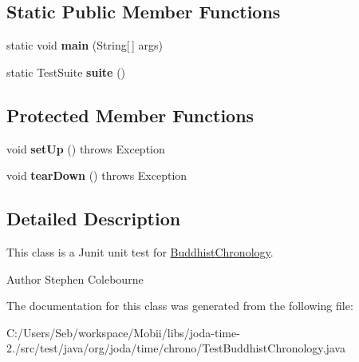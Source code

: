 \subsection*{Static Public Member Functions}
\begin{DoxyCompactItemize}
\item 
\hypertarget{classorg_1_1joda_1_1time_1_1chrono_1_1_test_buddhist_chronology_a3ef1d36da8af4e11a706c5406838f639}{static void {\bfseries main} (String\mbox{[}$\,$\mbox{]} args)}\label{classorg_1_1joda_1_1time_1_1chrono_1_1_test_buddhist_chronology_a3ef1d36da8af4e11a706c5406838f639}

\item 
\hypertarget{classorg_1_1joda_1_1time_1_1chrono_1_1_test_buddhist_chronology_ae6ef31639ce31a99a58aafcbc7c4f91e}{static Test\-Suite {\bfseries suite} ()}\label{classorg_1_1joda_1_1time_1_1chrono_1_1_test_buddhist_chronology_ae6ef31639ce31a99a58aafcbc7c4f91e}

\end{DoxyCompactItemize}
\subsection*{Protected Member Functions}
\begin{DoxyCompactItemize}
\item 
\hypertarget{classorg_1_1joda_1_1time_1_1chrono_1_1_test_buddhist_chronology_aac943cf994384e84078bd332566305e5}{void {\bfseries set\-Up} ()  throws Exception }\label{classorg_1_1joda_1_1time_1_1chrono_1_1_test_buddhist_chronology_aac943cf994384e84078bd332566305e5}

\item 
\hypertarget{classorg_1_1joda_1_1time_1_1chrono_1_1_test_buddhist_chronology_a094091369cb1e7ff5d5949b1d19d3d20}{void {\bfseries tear\-Down} ()  throws Exception }\label{classorg_1_1joda_1_1time_1_1chrono_1_1_test_buddhist_chronology_a094091369cb1e7ff5d5949b1d19d3d20}

\end{DoxyCompactItemize}


\subsection{Detailed Description}
This class is a Junit unit test for \hyperlink{classorg_1_1joda_1_1time_1_1chrono_1_1_buddhist_chronology}{Buddhist\-Chronology}.

\begin{DoxyAuthor}{Author}
Stephen Colebourne 
\end{DoxyAuthor}


The documentation for this class was generated from the following file\-:\begin{DoxyCompactItemize}
\item 
C\-:/\-Users/\-Seb/workspace/\-Mobii/libs/joda-\/time-\/2./src/test/java/org/joda/time/chrono/Test\-Buddhist\-Chronology.\-java\end{DoxyCompactItemize}
